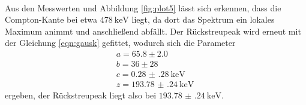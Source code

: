 \\
Aus den Messwerten und Abbildung \ref{fig:plot5} lässt sich erkennen, dass die
Compton-Kante bei etwa $\SI{478}{\kilo\electronvolt}$ liegt, da dort das Spektrum ein lokales
Maximum animmt und anschließend abfällt.
Der Rückstreupeak wird erneut mit der Gleichung \ref{eqn:gausk} gefittet, wodurch sich
die Parameter
\begin{align*}
  a = 65.8 \pm 2.0 \\
  b = 36 \pm 28 \\
  c = \SI{0.28(28)}{\kilo\electronvolt}\\
  z = \SI{193.78(24)}{\kilo\electronvolt} \:
\end{align*}
ergeben, der Rückstreupeak liegt also bei $\SI{193.78(24)}{\kilo\electronvolt}$.
